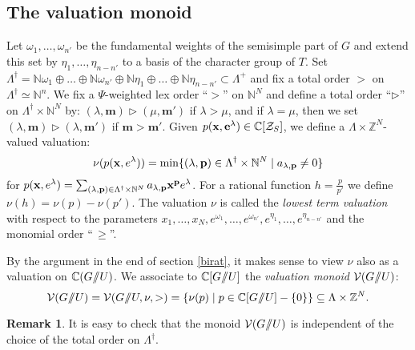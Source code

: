 \documentclass{emsprocart}
\theoremstyle{definition}
\newtheorem{remark}[theorem]{Remark}
\begin{document}
\subsection{The valuation monoid}\label{SValuationsemigroup}
Let $\omega_1,\ldots, \omega_{n'}$ be the fundamental weights of the semisimple part of $G$ and extend
this set by $\eta_{1},\ldots, \eta_{n-n'}$ to a basis of the character group of $T$.
Set $\Lambda^\dagger=\mathbb N\omega_1\oplus\ldots \oplus \mathbb N\omega_{n'}\oplus
\mathbb N\eta_{1}\oplus\ldots \oplus \mathbb N\eta_{n-n'}\subset \Lambda^+$\index{$\Lambda^\dagger$}
and fix a total order $>$ on $\Lambda^\dagger\simeq\mathbb N^{n}$.
We fix a $\Psi$-weighted lex order ``$>$'' on $\mathbb N^N$ and define a total
order ``$\triangleright$'' on $\Lambda^\dagger \times \mathbb N^N$ by: $(\lambda,\mathbf m)\triangleright(\mu,\mathbf m')$
if  $\lambda > \mu$, and if $\lambda = \mu$, then we set  $(\lambda,\mathbf m)\triangleright(\lambda,\mathbf m')$
if $\mathbf m>\mathbf m'$.
Given  $p(\mathbf x,\mathbf e^{\lambda})\in \mathbb C[{\cal Z}_S]$,
we define a $\Lambda\times\mathbb Z^N$-valued valuation:
\begin{equation}\label{valuationdef2}
\nu(p({\bf x}, e^{\lambda}))=\min\{(\lambda,{\mathbf p}) \in  \Lambda^\dagger\times\mathbb N^N\mid a_{\lambda,\mathbf p}\not=0\}
\end{equation}
for $p(\mathbf x, e^{\lambda}) = \sum_{(\lambda, {\bf p})\in  \Lambda^\dagger\times\mathbb N^N} a_{\lambda,\bf p} {\bf x}^{\bf p} e^\lambda$.
For a rational function $h = \frac{p}{p'}$ we define $\nu(h)=\nu(p)-\nu(p')$.
The valuation $\nu$ is called the {\it lowest term valuation} with respect to the
para\-meters $x_{{1}},\ldots, x_{N}, e^{\omega_1},\ldots,e^{\omega_{n'}},e^{\eta_1},\ldots,e^{\eta_{n-n'}}$ and the monomial order ``$\,\ge$''.

By the argument in the end of section \ref{birat}, it makes sense to view $\nu$ also as a valuation on $\mathbb C(G/\hskip -3.5pt/U)$.
We associate to $\mathbb C[G/\hskip -3.5pt/U]$ the {\it valuation monoid} ${\cal V}(G/\hskip -3.5pt/U)$:
\begin{equation}\label{valuationsemigroup}
{\cal V}(G/\hskip -3.5pt/U)={\cal V}(G/\hskip -3.5pt/U,\nu,>)
=\{\nu({p})\mid p\in \mathbb C[G/\hskip -3.5pt/U]-\{0\}\}
\subseteq \Lambda\times\mathbb Z^N.
\end{equation}
\begin{remark}\label{nueinsbewertung} It is easy to check that
the monoid ${\cal V}(G/\hskip -3.5pt/U)$ is independent of the choice of the total order on $\Lambda^\dagger$.
\end{remark}
\end{document}
